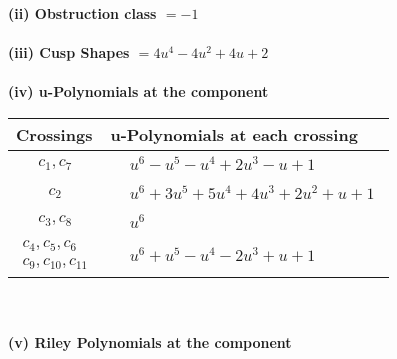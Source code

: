 \documentclass[1p]{elsarticle_modified}
\theoremstyle{definition}
\begin{document}
\flushleft \textbf{(ii) Obstruction class $= -1$}\\~\\
\flushleft \textbf{(iii) Cusp Shapes $= 4 u^4-4 u^2+4 u+2$}\\~\\
\newpage\renewcommand{\arraystretch}{1}
\flushleft \textbf{(iv) u-Polynomials at the component}\newline \\
\begin{tabular}{m{50pt}|m{274pt}}
Crossings & \hspace{64pt}u-Polynomials at each crossing \\
\hline $$\begin{aligned}c_{1},c_{7}\end{aligned}$$&$\begin{aligned}
&u^6- u^5- u^4+2 u^3- u+1
\end{aligned}$\\
\hline $$\begin{aligned}c_{2}\end{aligned}$$&$\begin{aligned}
&u^6+3 u^5+5 u^4+4 u^3+2 u^2+u+1
\end{aligned}$\\
\hline $$\begin{aligned}c_{3},c_{8}\end{aligned}$$&$\begin{aligned}
&u^6
\end{aligned}$\\
\hline $$\begin{aligned}c_{4},c_{5},c_{6}\\c_{9},c_{10},c_{11}\end{aligned}$$&$\begin{aligned}
&u^6+u^5- u^4-2 u^3+u+1
\end{aligned}$\\
\hline
\end{tabular}\\~\\
\newpage\renewcommand{\arraystretch}{1}
\flushleft \textbf{(v) Riley Polynomials at the component}\newline \\
\end{document}
